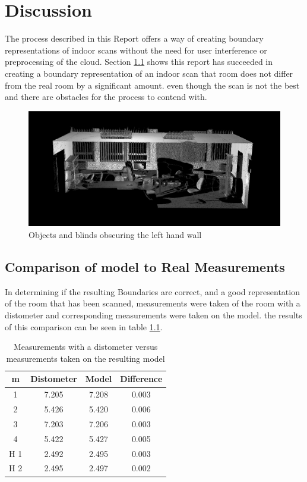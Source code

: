 \chapter{Discussion}
	\label{discussion}
	The process described in this Report offers a way of creating boundary representations of indoor scans without the need for user interference or preprocessing of the cloud. Section \ref{Comparison} shows this report has succeeded in creating a boundary representation of an indoor scan that room does not differ from the real room by a significant amount. even though the scan is not the best and there are obstacles for the process to contend with. 
	
	\begin{figure}[H]
	\centering
	\includegraphics[width=0.9\linewidth]{"Includes/images/Results/Messy Wall"}
	\caption{Objects and blinds obscuring the left hand wall}
	\label{fig:MessyWall}
	\end{figure}
	
	
	\section{Comparison of model to Real Measurements}
		\label{Comparison}
		In determining if the resulting Boundaries are correct, and a good representation of the room that has been scanned, measurements were taken of the room with a distometer and corresponding measurements were taken on the model. the results of this comparison can be seen in table \ref{MeasurmensTable}. 
		
		\begin{table}[H]
			\centering
			\begin{tabular}{|c|c|c|c|}
				\hline m & Distometer & Model & Difference \\ 
				\hline 1 & 7.205 & 7.208 & 0.003 \\ 
				\hline 2 & 5.426 & 5.420 & 0.006 \\ 
				\hline 3 & 7.203 & 7.206 & 0.003 \\ 
				\hline 4 & 5.422 & 5.427 & 0.005 \\ 
				\hline H 1 & 2.492 & 2.495 & 0.003 \\ 
				\hline H 2 & 2.495 & 2.497 & 0.002 \\ %
				\hline
			\end{tabular}
			\caption{Measurements with a distometer versus measurements taken on the resulting model}
			\label{MeasurmensTable}
		\end{table}
		
